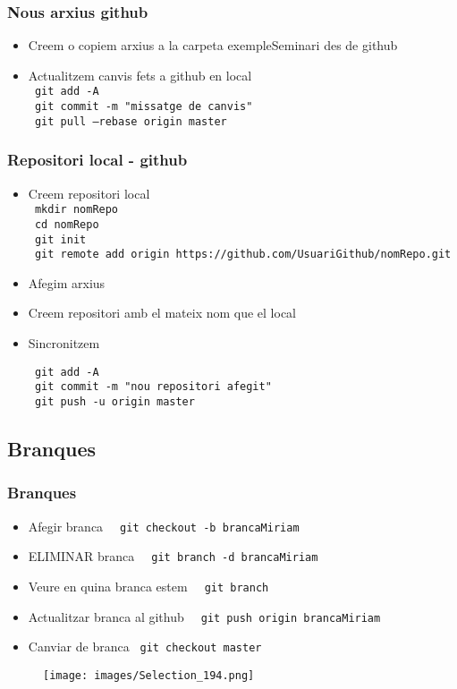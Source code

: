 \documentclass{beamer}
\newcommand{\shellcmd}[1]{{\color{blue}\indent\indent\texttt{\footnotesize\ #1}\\}}
\begin{document}
\begin{frame}
	\frametitle{Nous arxius github}
	\begin{itemize}
		\item Creem o copiem arxius a la carpeta exempleSeminari des de github
		\item Actualitzem canvis fets a github en local\\
		\shellcmd{git add -A }
		\shellcmd{git commit -m "missatge de canvis"}
		\shellcmd{git pull --rebase origin master}
		
	\end{itemize}	
\end{frame}


\begin{frame}
	\frametitle{Repositori local - github}
	\begin{itemize}
		\item Creem repositori local \\
		\shellcmd{mkdir nomRepo}
		\shellcmd{cd nomRepo}
		\shellcmd{git init}
		\shellcmd{git remote add origin https://github.com/UsuariGithub/nomRepo.git}
		\item Afegim arxius
		\item Creem repositori amb el mateix nom que el local
		\item Sincronitzem
		
		\shellcmd{git add -A}
		\shellcmd{git commit -m "nou repositori afegit"}
		\shellcmd{git push -u origin master}
		
		
	\end{itemize}	
\end{frame}


\subsection{Branques}
\begin{frame}
	\frametitle{Branques}
	\begin{itemize}
		\item Afegir branca \shellcmd{ git checkout -b brancaMiriam}
		\item ELIMINAR branca  \shellcmd{ git branch -d brancaMiriam}
		\item Veure en quina branca estem  \shellcmd{ git branch}
		\item Actualitzar branca al github \shellcmd{ git push origin brancaMiriam}
		\item Canviar de branca \shellcmd{git checkout master}
	\end{itemize}
		\begin{figure}
			\texttt{[image: images/Selection\_194.png]}
		\end{figure}
\end{frame}
\end{document}

